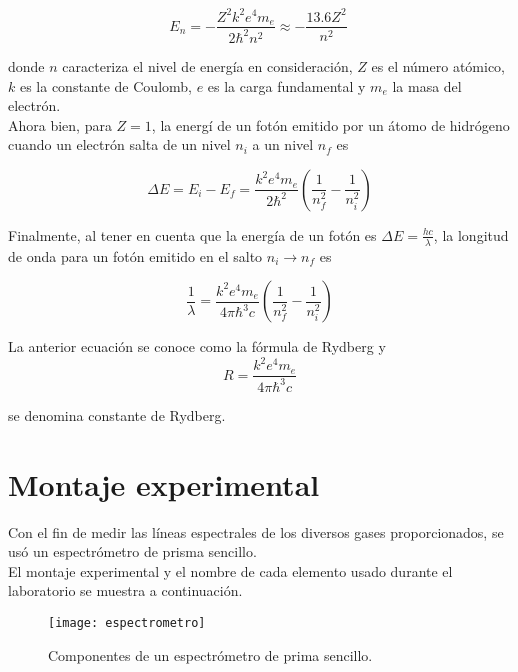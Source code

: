 \documentclass[prb,aps,twocolumn,preprintnumbers,amsmath,amssymb]{revtex4}
\begin{document}
\begin{equation}
E_{n} = -\frac{Z^2 k^2 e^4 m_{e}}{2 \hbar^2 n^2} \approx -\frac{13.6 Z^2}{n^2}\    
\end{equation}

\noindent
donde $n$ caracteriza el nivel de energía en consideración, $Z$ es el número atómico, $k$ es la constante de Coulomb, $e$ es la carga fundamental y $m_{e}$ la masa del electrón.
\\
Ahora bien, para $Z = 1$, la energí de un fotón emitido por un átomo de hidrógeno cuando un electrón salta de un nivel $n_{i}$ a un nivel $n_{f}$ es

\begin{equation}
\Delta E = E_{i} - E_{f} = \frac{k^2 e^4 m_{e}}{2 \hbar ^2} \left(\frac{1}{n_{f}^2}- \frac{1}{n_{i}^2} \right)  
\end{equation}

Finalmente, al tener en cuenta que la energía de un fotón es $\Delta E = \frac{hc}{\lambda}$, la longitud de onda para un fotón emitido en el salto $n_{i} \rightarrow n_{f}$ es

\begin{equation}
\frac{1}{\lambda} = \frac{k^2 e^4 m_{e}}{4 \pi \hbar ^3 c} \left(\frac{1}{n_{f}^2}- \frac{1}{n_{i}^2} \right)  
\end{equation}

La anterior ecuación se conoce como la fórmula de Rydberg y 
\\

\begin{equation}
\label{rydberg}
R = \frac{k^2 e^4 m_{e}}{4 \pi \hbar ^3 c}
\end{equation}

se denomina constante de Rydberg.

\section{Montaje experimental}

Con el fin de medir las líneas espectrales de los diversos gases proporcionados, se usó un espectrómetro de prisma sencillo.\\ 

El montaje experimental y el nombre de cada elemento usado durante el laboratorio se muestra a continuación.\\

\begin{figure}[h!]
	\centering
	\texttt{[image: espectrometro]}
	\caption{Componentes de un espectrómetro de prima sencillo.}
\end{figure}
\end{document}

